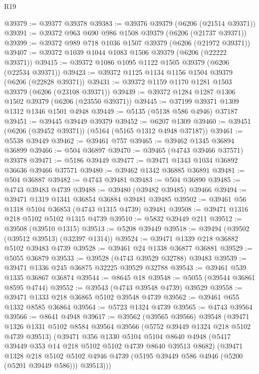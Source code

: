 \begin{lexlean}{R19}
\begin{coremodule}
{{{{{{{{{{{@39379 := @39377 @39378
@39383 := @39376 @39379 (@6206 (@21514 @39371))
@39391 := @39372 @963 @690 @986 @1508 @39379 (@6206 (@21737 @39371))
@39399 := @39372 @989 @718 @1036 @1507 @39379 (@6206 (@21972 @39371))
@39407 := @39372 @1039 @1044 @1083 @1506 @39379 (@6206 (@22222 @39371))
@39415 := @39372 @1086 @1095 @1122 @1505 @39379 (@6206 (@22534 @39371))
@39423 := @39372 @1125 @1134 @1156 @1504 @39379 (@6206 (@22828 @39371))
@39431 := @39372 @1159 @1170 @1281 @1503 @39379 (@6206 (@23108 @39371))
@39439 := @39372 @1284 @1287 @1306 @1502 @39379 (@6206 (@23550 @39371))
@39445 := @37199 @39371 @1309 @1312 @1346 @1501 @4948
@39449 := @5135 (@5138 @586 @4946) @37187
@39451 := @39445 @39449 @39379
@39452 := @6207 @1309
@39460 := @39451 (@6206 (@39452 @39371)) (@5164 (@5165 @1312 @4948 @37187))
@39461 := @5538 @39449
@39462 := @39461 @757
@39465 := @39462 @1345 @36894 @36899
@39466 := @504 @36897
@39470 := @39465 (@4743 @39466 @37571) @39378
@39471 := @5186 @39449
@39477 := @39471 @1343 @1034 @36892 @36636 @39466 @37571
@39480 := @39462 @1342 @36885 @36891
@39481 := @504 @36887
@39482 := @4743 @39481
@39483 := @504 @36890
@39485 := @4743 @39483 @4739
@39488 := @39480 (@39482 @39485) @39466
@39494 := @39471 @1319 @1341 @36854 @36884 @39481 @39485
@39502 := @39461 @56 @1318 @5104 @36853 (@4743 @1315 @4739) @39481
@39508 := @39471 @1316 @218 @5102 @5102 @1315 @4739
@39510 := @5832 @39449 @211
@39512 := @39508 (@39510 @1315)
@39513 := @5208 @39449
@39518 := @39494 (@39502 (@39512 @39513) (@32397 @1314))
@39524 := @39471 @1339 @218 @36882 @5102 @39483 @4739
@39528 := @39461 @24 @1338 @36877 @36881
@39529 := @5055 @36879
@39533 := @39528 (@4743 @39529 @32788) @39483
@39539 := @39471 @1336 @245 @36875 @32225 @39529 @32788
@39543 := @39461 @539 @1335 @36867 @36874
@39544 := @8645 @18
@39548 := @5055 (@39544 @36861 @8595 @4744)
@39552 := @39543 (@4743 @39548 @4739) @39529
@39558 := @39471 @1333 @218 @36865 @5102 @39548 @4739
@39562 := @39461 @655 @1332 @8585 @36864
@39564 := @5723 @1324 @4739
@39565 := @4743 @39564
@39566 := @8641 @4948
@39617 := @39562
    (@39565 @39566)
    @39548
    (@39471
      @1326
      @1331
      @5102
      @8584
      @39564
      @39566
      (@5752 @39449 @1324 @218 @5102 @4739 @39513)
      (@39471
        @356
        @1330
        @5104
        @5104
        @8640
        @4948
        (@5417 @39449 @353 @14 @218 @5102 @5102 @4739 @8640 @39513 @8682)
        (@39471
          @1328
          @218
          @5102
          @5102
          @4946
          @4739
          (@5195 @39449 @586 @4946 (@5200 (@5201 @39449 @586)))
          @39513)))
}}}}}}}}}}}
\end{coremodule}
\end{lexlean}
